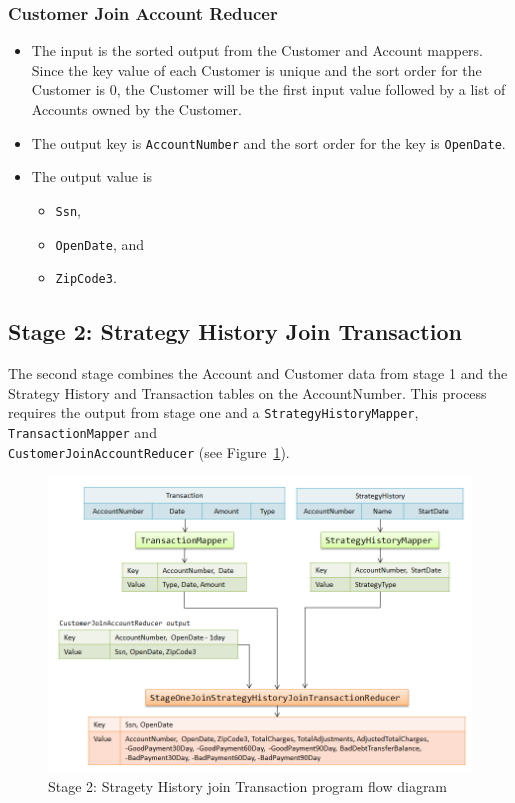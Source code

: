 \subsubsection{Customer Join Account Reducer}
  \begin{itemize}
  \item The input is the sorted output from the Customer and Account mappers. Since the key value of each Customer is unique and the sort order for the
  Customer is 0, the Customer will be the first input value followed by a list of Accounts owned by the Customer. 
  \item The output key is \texttt{AccountNumber} and the sort order for the key is \texttt{OpenDate}.
  \item The output value is
    \begin{itemize}
	 \item \texttt{Ssn},
	 \item \texttt{OpenDate}, and
	 \item \texttt{ZipCode3}.
    \end{itemize}
  \end{itemize}

\subsection{Stage 2: Strategy History Join Transaction}
The second stage combines the Account and Customer data from stage 1 and the Strategy History and Transaction tables on the AccountNumber. This process requires the output from stage one and a \texttt{StrategyHistoryMapper}, \texttt{TransactionMapper} and\\ \texttt{CustomerJoinAccountReducer} (see Figure~\ref{fig:stage2}). 

\begin{figure}[htc!]
 \centering
 \includegraphics[scale=0.60,bb=0 0 698 341]{../images/StageTwo.png}
  \caption{Stage 2: Stragety History join Transaction program flow diagram}
  \label{fig:stage2}
\end{figure}

